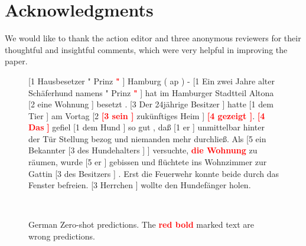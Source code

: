 \documentclass[11pt,a4paper]{article}
\begin{document}
\section{Acknowledgments}

We would like to thank the action editor and three
anonymous reviewers for their thoughtful and
insightful comments, which were very helpful
in improving the paper.




\begin{figure*}[ht!]
\small
[1 Hausbesetzer " Prinz \textcolor{red}{\bf "} ] Hamburg ( ap ) - [1 Ein zwei Jahre alter Schäferhund namens " Prinz \textcolor{red}{\bf "} ] hat im Hamburger Stadtteil Altona [2 eine Wohnung ] besetzt . [3 Der 24jährige Besitzer ] hatte [1 dem Tier ] am Vortag [2  \textcolor{red}{\bf [3 sein ]} zukünftiges Heim ] \textcolor{red}{\bf [4 gezeigt ]}. \textcolor{red}{\bf [4 } \textcolor{red}{\bf Das} \textcolor{red}{\bf ]} gefiel [1 dem Hund ] so gut , daß [1 er ] unmittelbar hinter der Tür Stellung bezog und niemanden mehr durchließ. Als [5 ein Bekannter [3 des Hundehalters ] ] versuchte, \textcolor{red}{\bf die Wohnung} zu räumen, wurde [5 er ] gebissen und flüchtete ins Wohnzimmer zur Gattin [3 des Besitzers ] . Erst die Feuerwehr konnte beide durch das Fenster befreien. [3 Herrchen ] wollte den Hundefänger holen. 
\\
\caption{German Zero-shot predictions. The \textcolor{red}{\bf red bold} marked text are wrong predictions. 
\label{fig:zero-german}
}

~\\


\end{figure*}
\end{document}
